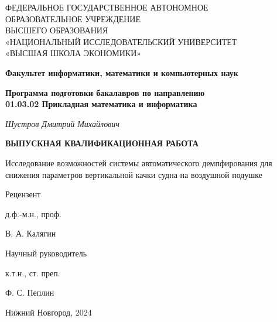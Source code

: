 \pagestyle{empty}

\begin{center}
    \textsc{
    ФЕДЕРАЛЬНОЕ ГОСУДАРСТВЕННОЕ АВТОНОМНОЕ\\
    ОБРАЗОВАТЕЛЬНОЕ УЧРЕЖДЕНИЕ\\
    ВЫСШЕГО ОБРАЗОВАНИЯ\\
    «НАЦИОНАЛЬНЫЙ ИССЛЕДОВАТЕЛЬСКИЙ УНИВЕРСИТЕТ\\
    «ВЫСШАЯ ШКОЛА ЭКОНОМИКИ»}
\end{center}

\vfill

\begin{center}
    \textbf{Факультет информатики, математики и компьютерных наук}

    \vspace{20pt}

    \textbf{Программа подготовки бакалавров по направлению \\
    01.03.02 Прикладная математика и информатика}
\end{center}

\vfill

\begin{center}
    \textit{Шустров Дмитрий Михайлович} 
    
    \vspace{20pt}
    
    \textbf{ВЫПУСКНАЯ КВАЛИФИКАЦИОННАЯ РАБОТА}

    \vspace{20pt}
    
    Исследование возможностей системы автоматического демпфирования для снижения параметров вертикальной качки судна на воздушной подушке
\end{center}

\vfill

\begin{minipage}[t]{0.4\textwidth}
    Рецензент 

    \vspace{5pt}
        
    д.ф.-м.н., проф.

    \vspace{5pt}

    В. А. Калягин
\end{minipage}
\hfill
\begin{minipage}[t]{0.4\textwidth}
    \begin{flushright}
    Научный руководитель

    \vspace{5pt}
        
    к.т.н., ст. преп.

    \vspace{5pt}
        
    Ф. С. Пеплин
    \end{flushright}
\end{minipage}

\vfill

\begin{center}
    Нижний Новгород, 2024
\end{center}